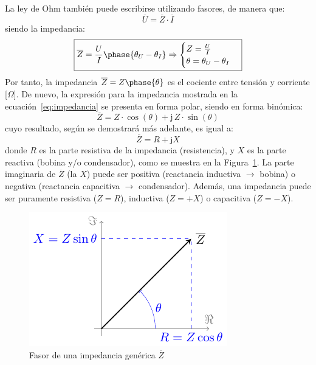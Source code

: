 La ley de Ohm también puede escribirse utilizando fasores, de manera
que:
\begin{equation}\label{eq:ohm_generalizada}
  \boxed{ \overline{U}=\overline{Z}\cdot\overline{I} }
\end{equation}
siendo la impedancia:
\begin{equation}\label{eq:impedancia}
  \boxed{\overline{Z} = \frac{U}{I}\phase{\theta_U - \theta_I} \Rightarrow 
    \begin{cases}
      Z = \frac{U}{I}\\
      \theta = \theta_U - \theta_I
    \end{cases}}
\end{equation}
Por tanto, la impedancia $\overline{Z}=Z\phase{\theta}$ es el cociente
entre tensión y corriente [$\Omega$]. De nuevo, la expresión para la
impedancia mostrada en la ecuación~\eqref{eq:impedancia} se presenta
en forma polar, siendo en forma binómica:
\begin{equation*}
  \overline{Z} = Z\cdot\cos(\theta)+\mathrm{j}\,Z\cdot\sin(\theta) %
\end{equation*}
cuyo resultado, según se demostrará más adelante, es igual a:
\begin{equation}
  \boxed{\overline{Z} =  R + \mathrm{j} X}
\end{equation}
donde $R$ es la parte resistiva de la impedancia (resistencia), y $X$
es la parte reactiva (bobina y/o condensador), como se muestra en la
Figura~\ref{fig:fasorimpedancia}. La parte imaginaria de
$\overline{Z}$ (la $X$) puede ser positiva (reactancia inductiva
$\rightarrow$ bobina) o negativa (reactancia capacitiva $\rightarrow$
condensador). Además, una impedancia puede ser puramente resistiva
($Z=R$), inductiva ($Z=+X$) o capacitiva ($Z=-X$).
\begin{figure}[H]
  \centering \includegraphics{../figs/fasorImpedancia.pdf}
  \caption{Fasor de una impedancia genérica $\overline{Z}$}
  \label{fig:fasorimpedancia}
\end{figure}
	
